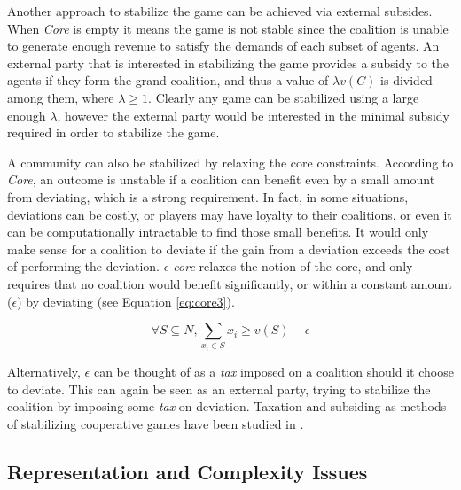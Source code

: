         Another approach to stabilize the game can be achieved via external subsides. When \emph{Core} is empty it means the game is not stable since the coalition is unable to generate enough revenue to satisfy the demands of each subset of agents. An external party that is interested in stabilizing the game provides a subsidy to the agents if they form the grand coalition, and thus a value of $\lambda v(C)$ is divided among them, where $\lambda \geq 1$. Clearly any game can be stabilized using a large enough $\lambda$, however the external party would be interested in the minimal subsidy required in order to stabilize the game.

        A community can also be stabilized by relaxing the core constraints. According to \emph{Core}, an outcome is unstable if a coalition can benefit even by a small amount from deviating, which is a strong requirement. In fact, in some situations, deviations can be costly, or players may have loyalty to their coalitions, or even it can be computationally intractable to find those small benefits. It would only make sense for a coalition to deviate if the gain from a deviation exceeds the cost of performing the deviation. \emph{$\epsilon$-core} relaxes the notion of the core, and only requires that no coalition would benefit significantly, or within a constant amount ($\epsilon$) by deviating (see Equation \ref{eq:core3}).

           \begin{equation}\label{eq:core3}
               \forall S \subseteq N, \sum_{x_i \in S} x_i \geq v(S) - \epsilon
           \end{equation}

        Alternatively, $\epsilon$ can be thought of as a \emph{tax} imposed on a coalition should it choose to deviate. This can again be seen as an external party, trying to stabilize the coalition by imposing some \emph{tax} on deviation. Taxation and subsiding as methods of stabilizing cooperative games have been studied in \cite{RePEc:spr:jogath:v:38:y:2009:i:1:p:3-16, Bachrach:2009:CSC:1692490.1692502, conf/ijcai/MeirRM11}.


        \subsection{Representation and Complexity Issues}\label{sec:CWSArchitecture}

